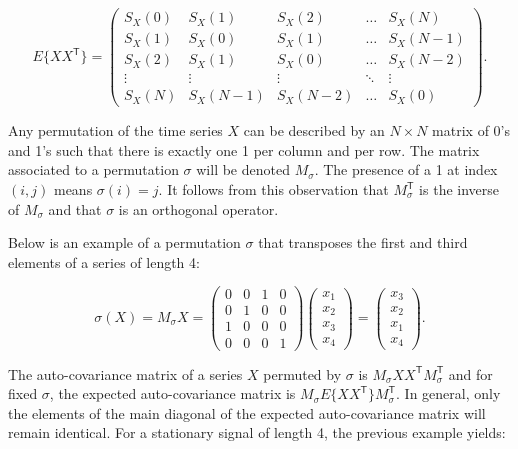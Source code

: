 \documentclass[12pt]{article}
\begin{document}
  \begin{equation}
    E\{X X^\mathsf{T}\} = \left( \begin{array}{ccccc}
      S_X(0) & S_X(1) & S_X(2) & \ldots & S_X(N) \\
      S_X(1) & S_X(0) & S_X(1) & \ldots & S_X(N-1) \\
      S_X(2) & S_X(1) & S_X(0) & \ldots & S_X(N-2) \\
      \vdots & \vdots & \vdots & \ddots & \vdots \\
      S_X(N) & S_X(N-1) & S_X(N-2) & \ldots & S_X(0)
    \end{array}
    \right).
  \end{equation}

  Any permutation of the time series $X$ can be described
  by an $N \times N$ matrix of 0's and 1's such that there is
  exactly one 1 per column and per row. The matrix associated
  to a permutation $\sigma$ will be denoted $M_\sigma$. The presence
  of a 1 at index $(i,j)$ means $\sigma(i)=j$. It follows from this
  observation that $M_\sigma^{\mathsf{T}}$ is the inverse of 
  $M_\sigma$ and that $\sigma$ is an orthogonal operator.

  Below is an example of a permutation $\sigma$ that transposes
  the first and third elements of a series of length 4:
 
  \begin{equation*}
    \sigma(X) = M_{\sigma} X =
    \left(
    \begin{array}{cccc}
      0 & 0 & 1 & 0 \\
      0 & 1 & 0 & 0 \\
      1 & 0 & 0 & 0 \\
      0 & 0 & 0 & 1
    \end{array}
    \right)
    \left(
    \begin{array}{c}
      x_1 \\
      x_2 \\
      x_3 \\
      x_4
    \end{array}
    \right) =
    \left(
    \begin{array}{c}
      x_3 \\
      x_2 \\
      x_1 \\
      x_4
    \end{array}
    \right).
  \end{equation*}

  The auto-covariance matrix of a series $X$ permuted by $\sigma$
  is $M_\sigma XX^\mathsf{T} M_\sigma^\mathsf{T}$
  and for fixed $\sigma$, the expected auto-covariance matrix is
  $M_\sigma E\{XX^\mathsf{T}\} M_\sigma^\mathsf{T}$.
  In general, only the elements of the main diagonal of the expected 
  auto-covariance matrix will remain identical. For a stationary
  signal of length 4, the previous example yields:
\end{document}
